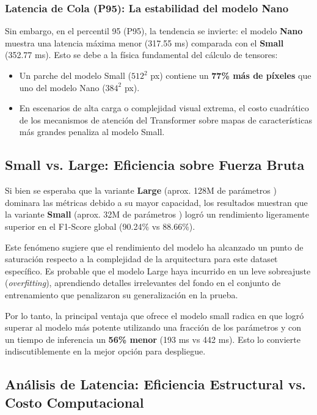 \subsubsection{Latencia de Cola (P95): La estabilidad del modelo Nano}
Sin embargo, en el percentil 95 (P95), la tendencia se invierte: el modelo \textbf{Nano} muestra una latencia máxima menor (317.55 ms) comparada con el \textbf{Small} (352.77 ms). Esto se debe a la física fundamental del cálculo de tensores:
\begin{itemize}
    \item Un parche del modelo Small ($512^2$ px) contiene un \textbf{77\% más de píxeles} que uno del modelo Nano ($384^2$ px).
    \item En escenarios de alta carga o complejidad visual extrema, el costo cuadrático de los mecanismos de atención del Transformer sobre mapas de características más grandes penaliza al modelo Small.
\end{itemize}

\subsection{Small vs. Large: Eficiencia sobre Fuerza Bruta}

Si bien se esperaba que la variante \textbf{Large} (aprox. 128M de parámetros ) dominara las métricas debido a su mayor capacidad, los resultados muestran que la variante \textbf{Small} (aprox. 32M de parámetros ) logró un rendimiento ligeramente superior en el F1-Score global (90.24\% vs 88.66\%).

Este fenómeno sugiere que el rendimiento del modelo ha alcanzado un punto de saturación respecto a la complejidad de la arquitectura para este dataset específico. Es probable que el modelo Large haya incurrido en un leve sobreajuste (\textit{overfitting}), aprendiendo detalles irrelevantes del fondo en el conjunto de entrenamiento que penalizaron su generalización en la prueba.

Por lo tanto, la principal ventaja que ofrece el modelo small radica en que logró superar al modelo más potente utilizando una fracción de los parámetros y con un tiempo de inferencia un \textbf{56\% menor} (193 ms vs 442 ms). Esto lo convierte indiscutiblemente en la mejor opción para despliegue.

\subsection{Análisis de Latencia: Eficiencia Estructural vs. Costo Computacional}

